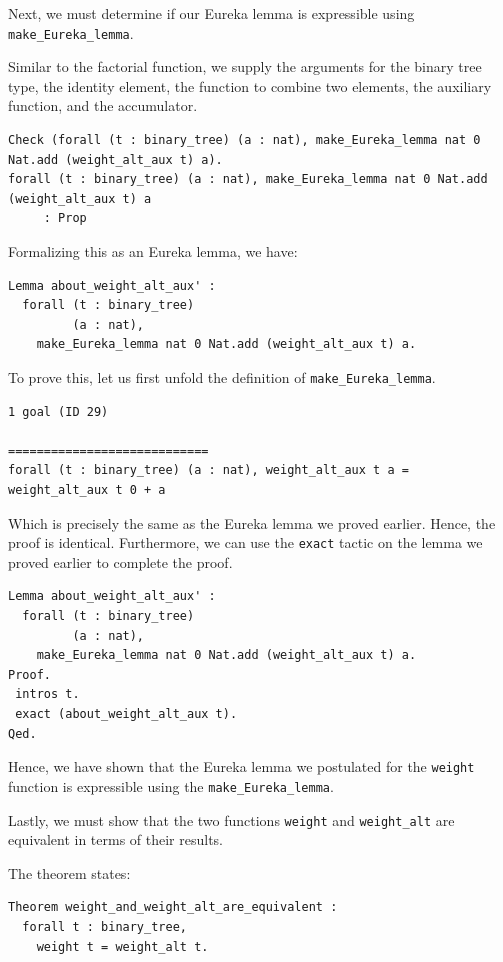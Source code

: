 \documentclass{article}
\begin{document}
Next, we must determine if our Eureka lemma is expressible using \texttt{make\_Eureka\_lemma}.

Similar to the factorial function, we supply the arguments for the binary tree type, the identity element, the function to combine two elements, the auxiliary function, and the accumulator.

\begin{lstlisting}
Check (forall (t : binary_tree) (a : nat), make_Eureka_lemma nat 0 Nat.add (weight_alt_aux t) a).
forall (t : binary_tree) (a : nat), make_Eureka_lemma nat 0 Nat.add (weight_alt_aux t) a
     : Prop
\end{lstlisting}

Formalizing this as an Eureka lemma, we have:

\begin{lstlisting}
Lemma about_weight_alt_aux' :
  forall (t : binary_tree)
         (a : nat),
    make_Eureka_lemma nat 0 Nat.add (weight_alt_aux t) a.
\end{lstlisting}

To prove this, let us first unfold the definition of \texttt{make\_Eureka\_lemma}.

\begin{lstlisting}
1 goal (ID 29)

============================
forall (t : binary_tree) (a : nat), weight_alt_aux t a = weight_alt_aux t 0 + a
\end{lstlisting}

Which is precisely the same as the Eureka lemma we proved earlier. Hence, the proof is identical. Furthermore, we can use the \texttt{exact} tactic on the lemma we proved earlier to complete the proof.

\begin{lstlisting}
Lemma about_weight_alt_aux' :
  forall (t : binary_tree)
         (a : nat),
    make_Eureka_lemma nat 0 Nat.add (weight_alt_aux t) a.
Proof.
 intros t.
 exact (about_weight_alt_aux t).
Qed.
\end{lstlisting}

Hence, we have shown that the Eureka lemma we postulated for the \texttt{weight} function is expressible using the \texttt{make\_Eureka\_lemma}.

Lastly, we must show that the two functions \texttt{weight} and \texttt{weight\_alt} are equivalent in terms of their results.

The theorem states:

\begin{lstlisting}
Theorem weight_and_weight_alt_are_equivalent :
  forall t : binary_tree,
    weight t = weight_alt t.
\end{lstlisting}
\end{document}
